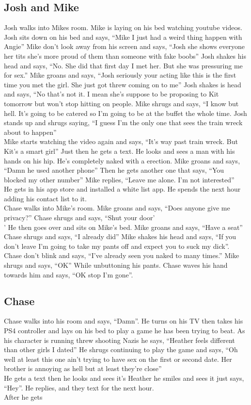 \documentclass{article}[12px]
\begin{document}
	\subsection* {Josh and Mike}
	Josh walks into Mikes room. Mike is laying on his bed watching youtube videos. Josh sits down on his bed and says, ``Mike I just had a weird thing happen with Angie'' Mike don't look away from his screen and says, ``Josh she shows everyone her tits she's more proud of them than someone with fake boobs'' Josh shakes his head and says, ``No. She did that first day I met her. But she was pressuring me for sex.'' Mike groans and says, ``Josh seriously your acting like this is the first time you met the girl. She just got threw coming on to me'' Josh shakes is head and says, ``No that's not it. I mean she's suppose to be proposing to Kit tomorrow but won't stop hitting on people. Mike shrugs and says, ``I know but hell. It's going to be catered so I'm going to be at the buffet the whole time. Josh stands up and shrugs saying, ``I guess I'm the only one that sees the train wreck about to happen''\\
	
	Mike starts watching the video again and says, ``It's way past train wreck. But Kit's a smart girl'' Just then he gets a text. He looks and sees a man with his hands on his hip. He's completely naked with a erection. Mike groans and says, ``Damn he used another phone'' Then he gets another one that says, ``You blocked my other number'' Mike replies, ``Leave me alone. I'm not interested''\\
	
	He gets in his app store and installed a white list app. He spends the next hour adding his contact list to it.\\  
	
	Chase walks into Mike's room. Mike groans and says, ``Does anyone give me privacy?'' Chase shrugs and says, ``Shut your door'\\
	' 
	He then goes over and sits on Mike's bed. Mike groans and says, ``Have a seat'' Chase shrugs and says, ``I already did'' Mike shakes his head and says, ``If you don't leave I'm going to take my pants off and expect you to suck my dick''. Chase don't blink and says, ``I've already seen you naked to many times.'' Mike shrugs and says, ``OK'' While unbuttoning his pants. Chase waves his hand towards him and says, ``OK stop I'm gone''.
	
	\subsection *{Chase}
	Chase walks into his room and says, ``Damn''. He turns on his TV then takes his PS4 controller and lays on his bed to play a game he has been trying to beat. As his character is running threw shooting Nazis he says, ``Heather feels different than other girls I dated'' He shrugs continuing to play the game and says, ``Oh well at least this one ain't trying to have sex on the first or second date. Her brother is annoying as hell but at least they're close''\\
	
	He gets a text then he looks and sees it's Heather he smiles and sees it just says, ``Hey''. He replies, and they text for the next hour.\\
	After he gets 
\end{document}
